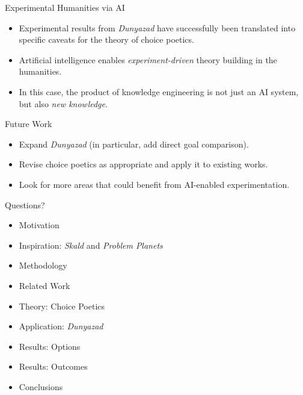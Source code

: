 \documentclass[xcolor=x11names]{beamer}
\def\dunyazad/{\textit{Dunyazad}}
\def\skald/{\textit{Skald}}
\def\problemplanets/{\textit{Problem Planets}}
\begin{document}
\begin{frame}{Experimental Humanities via AI}
  \begin{itemize}\addtolength{\itemsep}{0.5\baselineskip}
    \item Experimental results from \dunyazad/ have successfully been translated into specific caveats for the theory of choice poetics.
    \item Artificial intelligence enables \emph{experiment-driven} theory building in the humanities.
    \item In this case, the product of knowledge engineering is not just an AI system, but also \emph{new knowledge}.
  \end{itemize}
\end{frame}

\begin{frame}{Future Work}
  \begin{itemize}\addtolength{\itemsep}{0.5\baselineskip}
    \item Expand \dunyazad/ (in particular, add direct goal comparison).
    \item Revise choice poetics as appropriate and apply it to existing works.
    \item Look for more areas that could benefit from AI-enabled experimentation.
  \end{itemize}
\end{frame}

\begin{frame}{Questions?}
  \begin{itemize}
    \item Motivation
    \item Inspiration: \skald/ and \problemplanets/
    \item Methodology
    \item Related Work
    \item Theory: Choice Poetics
    \item Application: \dunyazad/
    \item Results: Options
    \item Results: Outcomes
    \item Conclusions
  \end{itemize}
\end{frame}
\end{document}
